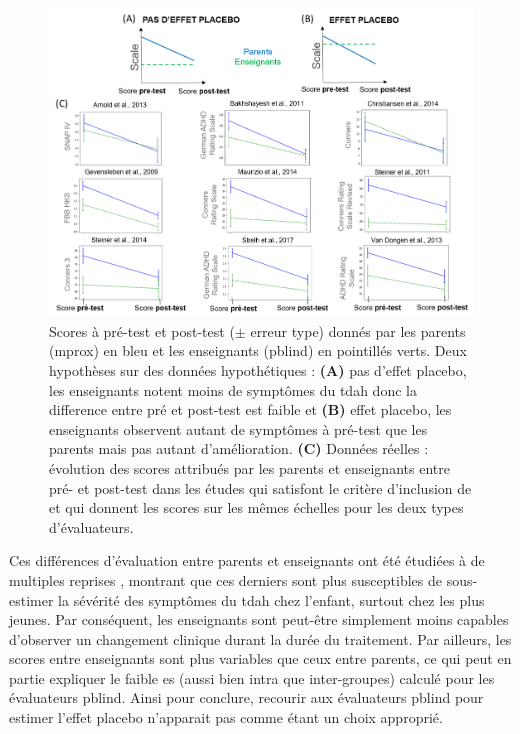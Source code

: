 \begin{figure}[h!]
  \centering
	\includegraphics[width=1\linewidth]{figures/chapter-3/factors-pblind-discussion} 
  \caption{Scores à pré-test et post-test ($\pm$ erreur type) donnés par les parents (\gls{mprox}) en bleu et les enseignants (\gls{pblind}) en pointillés verts. 
	Deux hypothèses sur des données hypothétiques : \textbf{(A)} pas d'effet placebo, les enseignants notent moins de symptômes du \gls{tdah} donc la difference entre pré et post-test est faible
	et \textbf{(B)} effet placebo, les enseignants observent autant de symptômes à pré-test que les parents mais pas autant d'amélioration. \textbf{(C)} Données réelles : 
	évolution des scores attribués par les parents et enseignants entre pré- et post-test dans les études qui satisfont le critère d'inclusion de \citeauthor{Cortese2016} 
	et qui donnent les scores sur les mêmes échelles pour les deux types d'évaluateurs.}
  \label{Figure:factors_pblind_discussion}
\end{figure}

Ces différences d'évaluation entre parents et enseignants ont été étudiées à de multiples reprises \citep{Sollie2013, Narad2015, Minder2018}, montrant que 
ces derniers sont plus susceptibles de sous-estimer la sévérité des symptômes du \gls{tdah} chez l'enfant, surtout chez les plus jeunes. Par conséquent, les 
enseignants sont peut-être simplement moins capables d'observer un changement clinique durant la durée du traitement. Par ailleurs, les scores entre enseignants 
sont plus variables que ceux entre parents, ce qui peut en partie expliquer le faible \gls{es} (aussi bien intra que inter-groupes) calculé pour les évaluateurs
\gls{pblind}. Ainsi pour conclure, recourir aux évaluateurs \gls{pblind} pour estimer l'effet placebo n'apparait pas comme étant un choix approprié. 

